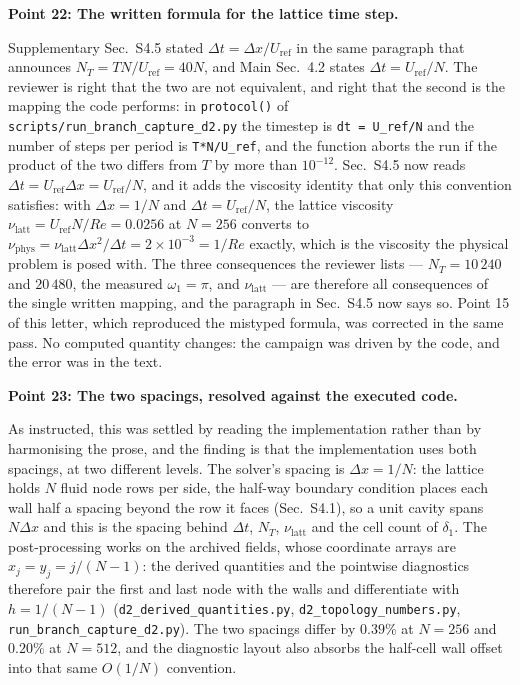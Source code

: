 \documentclass[11pt,a4paper]{article}
\begin{document}
\vspace{1em}

\noindent\textbf{Point 22: The written formula for the lattice time step.}

Supplementary Sec.~S4.5 stated $\Delta t=\Delta x/U_{\mathrm{ref}}$ in the same
paragraph that announces $N_T=TN/U_{\mathrm{ref}}=40N$, and Main Sec.~4.2 states
$\Delta t=U_{\mathrm{ref}}/N$. The reviewer is right that the two are not
equivalent, and right that the second is the mapping the code performs: in
\texttt{protocol()} of \texttt{scripts/run\_branch\_capture\_d2.py} the timestep is
\texttt{dt = U\_ref/N} and the number of steps per period is \texttt{T*N/U\_ref},
and the function aborts the run if the product of the two differs from $T$ by more
than $10^{-12}$. Sec.~S4.5 now reads
$\Delta t=U_{\mathrm{ref}}\Delta x=U_{\mathrm{ref}}/N$, and it adds the viscosity
identity that only this convention satisfies: with $\Delta x=1/N$ and
$\Delta t=U_{\mathrm{ref}}/N$, the lattice viscosity
$\nu_{\mathrm{latt}}=U_{\mathrm{ref}}N/Re=0.0256$ at $N=256$ converts to
$\nu_{\mathrm{phys}}=\nu_{\mathrm{latt}}\Delta x^{2}/\Delta t=2\times10^{-3}=1/Re$
exactly, which is the viscosity the physical problem is posed with. The three
consequences the reviewer lists --- $N_T=10\,240$ and $20\,480$, the measured
$\omega_1=\pi$, and $\nu_{\mathrm{latt}}$ --- are therefore all consequences of the
single written mapping, and the paragraph in Sec.~S4.5 now says so. Point 15 of
this letter, which reproduced the mistyped formula, was corrected in the same pass.
No computed quantity changes: the campaign was driven by the code, and the error was
in the text.

\vspace{1em}

\noindent\textbf{Point 23: The two spacings, resolved against the executed code.}

As instructed, this was settled by reading the implementation rather than by
harmonising the prose, and the finding is that the implementation uses both
spacings, at two different levels. The solver's spacing is $\Delta x=1/N$: the
lattice holds $N$ fluid node rows per side, the half-way boundary condition places
each wall half a spacing beyond the row it faces (Sec.~S4.1), so a unit cavity
spans $N\Delta x$ and this is the spacing behind $\Delta t$, $N_T$,
$\nu_{\mathrm{latt}}$ and the cell count of $\delta_1$. The post-processing works on
the archived fields, whose coordinate arrays are $x_j=y_j=j/(N-1)$: the derived
quantities and the pointwise diagnostics therefore pair the first and last node with
the walls and differentiate with $h=1/(N-1)$
(\texttt{d2\_derived\_quantities.py}, \texttt{d2\_topology\_numbers.py},
\texttt{run\_branch\_capture\_d2.py}). The two spacings differ by $0.39\%$ at
$N=256$ and $0.20\%$ at $N=512$, and the diagnostic layout also absorbs the
half-cell wall offset into that same $O(1/N)$ convention.
\end{document}
